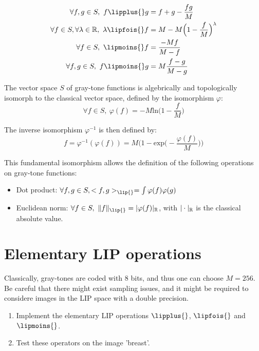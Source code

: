 \begin{align}
 \forall f, g \in S, ~f\lipplus{}g&=f+g-\frac{fg}{M} \\
 \forall f\in S, \forall \lambda\in\R, ~\lambda\lipfois{} f &= M-M\Big(1-\frac{f}{M}\Big)^\lambda \\
 \forall f\in S, ~\lipmoins{} f &= \frac{-Mf}{M-f} \\
 \forall f,g\in S, ~f\lipmoins{}g &= M\frac{f-g}{M-g}
\end{align}

The vector space $S$ of gray-tone functions is algebrically and topologically isomorph to the classical vector space, defined by the isomorphism $\varphi$:\vspace*{-5pt}
\begin{equation}\forall f\in S, ~\varphi(f) = -M \textrm{ln}\Big(1-\frac{f}{M}\Big)
\end{equation}


The inverse isomorphism $\varphi^{-1}$ is then defined by:\vspace*{-5pt}
\begin{equation}f = \varphi^{-1}(\varphi(f)) = M\Big( 1-\textrm{exp}\Big(-\frac{\varphi(f)}{M}\Big)\Big)
\end{equation}


This fundamental isomorphism allows the definition of the following operations on gray-tone functions:
\begin{itemize}
 \item Dot product: $\forall f,g \in S, <f,g>_{\lip{}}=\int\varphi(f)\varphi(g)$
 \item Euclidean norm: $\forall f \in S,\ \Vert f\Vert_{\lip{}} = |\varphi(f)|_\R$, with $|\cdot|_{\mathbb{R}}$ is the classical absolute value.
\end{itemize}

\vspace*{-12pt}

\section{Elementary LIP operations}
Classically, gray-tones are coded with 8 bits, and thus one can choose $M=256$. Be careful that there might exist sampling issues, and it might be required to considere images in the LIP space with a double precision.

\begin{qbox}
\begin{enumerate}
	\item Implement the elementary LIP operations $\lipplus{}$, $\lipfois{}$ and $\lipmoins{}$.
	\item Test these operators on the image 'breast'.
\end{enumerate}
\end{qbox}

